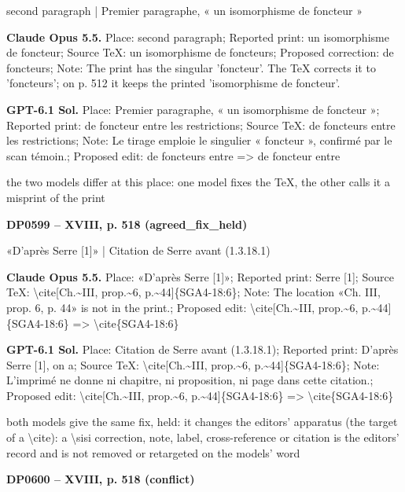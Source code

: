 second paragraph | Premier paragraphe, « un isomorphisme de foncteur »\par
\textbf{Claude Opus 5.5.} Place: second paragraph; Reported print: un isomorphisme de foncteur; Source TeX: un isomorphisme de foncteurs; Proposed correction: de foncteurs; Note: The print has the singular 'foncteur'. The TeX corrects it to 'foncteurs'; on p. 512 it keeps the printed 'isomorphisme de foncteur'.\par
\textbf{GPT-6.1 Sol.} Place: Premier paragraphe, « un isomorphisme de foncteur »; Reported print: de foncteur entre les restrictions; Source TeX: de foncteurs entre les restrictions; Note: Le tirage emploie le singulier « foncteur », confirmé par le scan témoin.; Proposed edit: de foncteurs entre =\allowbreak > de foncteur entre\par
the two models differ at this place: one model fixes the TeX, the other calls it a misprint of the print\par
\par\noindent\hypertarget{DP0599}{}\textbf{DP0599 -- XVIII, p. 518 (agreed\_fix\_held)}\par
«D'après Serre [1]» | Citation de Serre avant (1.3.18.1)\par
\textbf{Claude Opus 5.5.} Place: «D'après Serre [1]»; Reported print: Serre [1]; Source TeX: \textbackslash{}cite[Ch.\textasciitilde{}III, prop.\textasciitilde{}6, p.\textasciitilde{}44]\{SGA4-18:6\}; Note: The location «Ch. III, prop. 6, p. 44» is not in the print.; Proposed edit: \textbackslash{}cite[Ch.\textasciitilde{}III, prop.\textasciitilde{}6, p.\textasciitilde{}44]\{SGA4-18:6\} =\allowbreak > \textbackslash{}cite\{SGA4-18:6\}\par
\textbf{GPT-6.1 Sol.} Place: Citation de Serre avant (1.3.18.1); Reported print: D'après Serre [1], on a; Source TeX: \textbackslash{}cite[Ch.\textasciitilde{}III, prop.\textasciitilde{}6, p.\textasciitilde{}44]\{SGA4-18:6\}; Note: L'imprimé ne donne ni chapitre, ni proposition, ni page dans cette citation.; Proposed edit: \textbackslash{}cite[Ch.\textasciitilde{}III, prop.\textasciitilde{}6, p.\textasciitilde{}44]\{SGA4-18:6\} =\allowbreak > \textbackslash{}cite\{SGA4-18:6\}\par
both models give the same fix, held: it changes the editors' apparatus (the target of a \textbackslash{}cite): a \textbackslash{}sisi correction, note, label, cross-reference or citation is the editors' record and is not removed or retargeted on the models' word\par
\par\noindent\hypertarget{DP0600}{}\textbf{DP0600 -- XVIII, p. 518 (conflict)}\par
